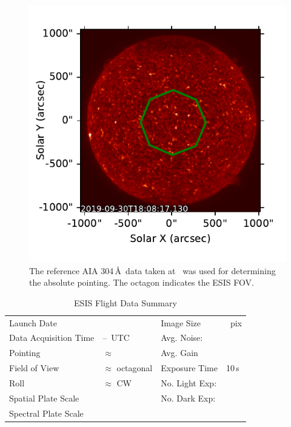 \documentclass[linenumbers,trackchanges]{aastex63}
\begin{document}
		
		
		\begin{figure}
			\begin{center}
				\includegraphics{esis_pointing}
				\caption{The reference AIA 304\,\AA\ data taken at \aianearapogee \ was used for determining the absolute pointing. The octagon indicates the ESIS FOV.}
				\label{fig:fov}
			\end{center}
		\end{figure}
	

		\begin{table}
		\begin{center}
			\caption{ESIS Flight Data Summary}
			\label{tab:data_info}
			\begin{tabular}{ll|ll}\hline
				Launch Date & \dateMission & Image Size  & \imageShape~pix\\
				Data Acquisition Time & \timeDataStart--\timeDataStop~UTC & Avg. Noise: & \readoutNoise\\ 
			    Pointing   &  $\approx$ \esispointing & Avg. Gain &   \gain \\
				Field of View  & $\approx$ \esisfov octagonal  & Exposure Time & 10\,s \\
				Roll & $\approx$ \esisroll CW & No. Light Exp: &\numDataFrames\\
			    Spatial  Plate Scale  &  \plateScale & No. Dark Exp: &\numDarkFrames \\
				Spectral  Plate Scale  &  \dispersion & \\
					\hline
			\end{tabular}
		
		\end{center}
		\end{table}
		
\end{document}
